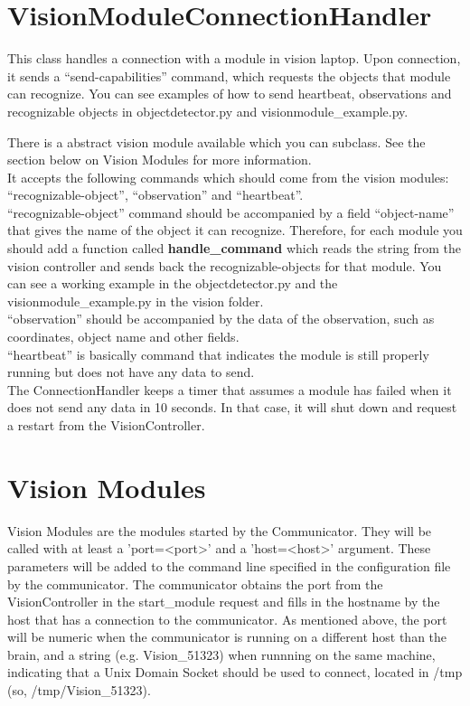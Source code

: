 \documentclass[a4paper, 10pt, oneside]{article}
\begin{document}
\section{VisionModuleConnectionHandler}
This class handles a connection with a module in vision laptop. Upon connection,
it sends a ``send-capabilities'' command, which requests the objects that module
can recognize. You can see examples of how to send heartbeat, observations and
recognizable objects in objectdetector.py and visionmodule\_example.py. 

There is a abstract vision module available which you can subclass. See the
section below on Vision Modules for more information. \\

It accepts the following commands which should come from the vision modules:
``recognizable-object'', ``observation'' and ``heartbeat''. \\

``recognizable-object'' command should be accompanied by a field ``object-name''
that gives the name of the object it can recognize. Therefore, for each module
you should add a function called \textbf{handle\_command} which reads the string
from the vision controller and sends back the recognizable-objects for that
module. You can see a working example in the objectdetector.py and the
visionmodule\_example.py in the vision folder.  \\

``observation'' should be accompanied by the data of the observation, such as
coordinates, object name and other fields. \\

``heartbeat'' is basically command that indicates the module is still properly
running but does not have any data to send. \\

The ConnectionHandler keeps a timer that assumes a module has failed when it
does not send any data in 10 seconds. In that case, it will shut down and
request a restart from the VisionController. \\

\section{Vision Modules}
Vision Modules are the modules started by the Communicator. They will be called
with at least a 'port=<port>' and a 'host=<host>' argument. These parameters
will be added to the command line specified in the configuration file by the
communicator. The communicator obtains the port from the VisionController in the
start\_module request and fills in the hostname by the host that has a
connection to the communicator. As mentioned above, the port will be numeric
when the communicator is running on a different host than the brain, and a
string (e.g. Vision\_51323) when runnning on the same machine, indicating that a
Unix Domain Socket should be used to connect, located in /tmp (so,
/tmp/Vision\_51323). \\
\end{document}
